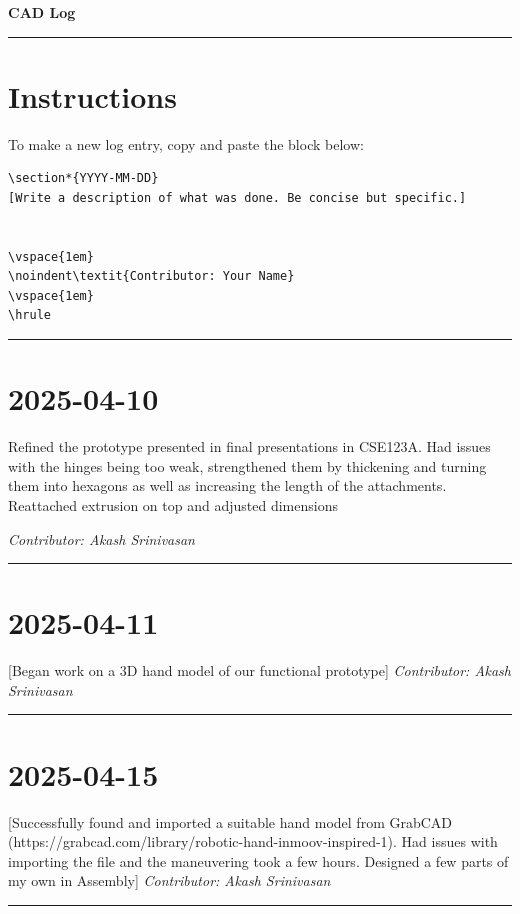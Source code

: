 \documentclass[12pt]{article}
\begin{document}
\begin{center}
    {\Huge\bfseries CAD Log}
\end{center}
\vspace{1em}
\hrule
\vspace{1em}


\section*{Instructions}
To make a new log entry, copy and paste the block below:


\begin{verbatim}
\section*{YYYY-MM-DD}
[Write a description of what was done. Be concise but specific.]


\vspace{1em}
\noindent\textit{Contributor: Your Name}
\vspace{1em}
\hrule
\end{verbatim}


\vspace{1em}
\hrule
\vspace{1em}

\section*{2025-04-10}
Refined the prototype presented in final presentations in CSE123A. Had issues with the hinges being too weak, strengthened them by thickening and turning them into hexagons as well as increasing the length of the attachments. Reattached extrusion on top and adjusted dimensions


\vspace{1em}
\noindent\textit{Contributor: Akash Srinivasan}
\vspace{1em}
\hrule

\section*{2025-04-11}
[Began work on a 3D hand model of our functional prototype]
\vspace{1em}
\noindent\textit{Contributor: Akash Srinivasan}
\vspace{1em}
\hrule

\section*{2025-04-15}
[Successfully found and imported a suitable hand model from GrabCAD (https://grabcad.com/library/robotic-hand-inmoov-inspired-1). Had issues with importing the file and the maneuvering took a few hours. Designed a few parts of my own in Assembly]
\vspace{1em}
\noindent\textit{Contributor: Akash Srinivasan}
\vspace{1em}
\hrule
\end{document}
